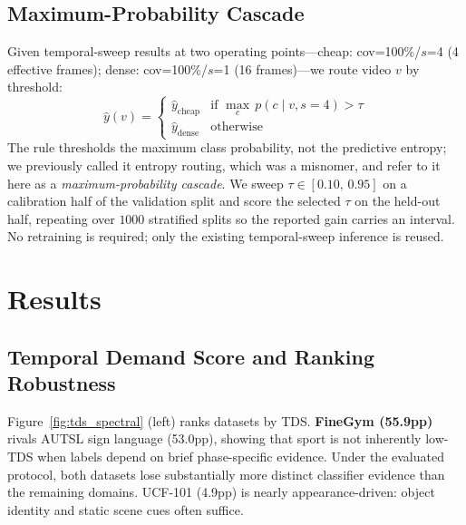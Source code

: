 \documentclass[runningheads]{llncs}
\newcommand{\TDS}{\textsc{TDS}}
\newcommand{\rev}[1]{\textcolor{revblue}{#1}}
\newcommand{\revdel}[1]{}
\begin{document}
\subsection{\rev{Maximum-Probability Cascade}}

Given temporal-sweep results at two operating points---cheap: cov=100\%/$s$=4 (4 effective frames); dense: cov=100\%/$s$=1 (16 frames)---we route video $v$ by threshold: \[ \hat{y}(v) = \begin{cases}
    \hat{y}_\text{cheap} & \text{if } \max_c\,p(c\mid v,s{=}4) > \tau \\
    \hat{y}_\text{dense} & \text{otherwise}
  \end{cases}
\] \rev{The rule thresholds the maximum class probability, not the predictive entropy; we previously called it entropy routing, which was a misnomer, and refer to it here as a \emph{maximum-probability cascade}.} \revdel{We sweep $\tau\in[0.10,\,0.95]$ on the validation split and report the Pareto-optimal point at avg frames~$\leq8$.} \rev{We sweep $\tau\in[0.10,\,0.95]$ on a calibration half of the validation split and score the selected $\tau$ on the held-out half, repeating over $1000$ stratified splits so the reported gain carries an interval.} No retraining is required; only the existing temporal-sweep inference is reused.

\section{Results}
\label{sec:results}

\subsection{\rev{Temporal Demand Score and Ranking Robustness}}
\label{sec:results_tds}

Figure~\ref{fig:tds_spectral} (left) ranks datasets by \TDS{}. \revdel{\textbf{FineGym (55.9pp)} is the most important new finding in this dimension: fine-grained gymnastics phase transitions rival AUTSL sign language (53.0pp), showing that sport is not inherently low-\TDS{} when the label space requires sub-second phase discrimination. AUTSL requires dense sampling to discriminate fine handshape transitions, but FineGym's phase boundaries are comparably demanding.}\rev{\textbf{FineGym (55.9pp)} rivals AUTSL sign language (53.0pp), showing that sport is not inherently low-\TDS{} when labels depend on brief phase-specific evidence. Under the evaluated protocol, both datasets lose substantially more distinct classifier evidence than the remaining domains.} UCF-101 (4.9pp) is nearly appearance-driven: object identity and static scene cues often suffice.
\end{document}
